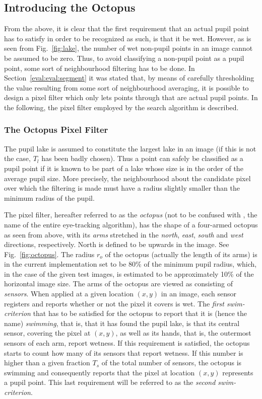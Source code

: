 \subsection{Introducing the Octopus}
\label{algo:seek:octopus}

From the above, it is clear that the first requirement that an actual
pupil point has to satisfy in order to be recognized as such, is that
it be wet.  However, as is seen from Fig.~\ref{fig:lake}, the number
of wet non-pupil points in an image cannot be assumed to be zero.
Thus, to avoid classifying a non-pupil point as a pupil point, some
sort of neighbourhood filtering has to be done.  In
Section~\ref{eval:eval:segment} it was stated that, by means of
carefully thresholding the value resulting from some sort of
neighbourhood averaging, it is possible to design a pixel filter which
only lets points through that are actual pupil points.  In the
following, the pixel filter employed by the search algorithm is
described.

\subsubsection{The Octopus Pixel Filter}

The pupil lake is assumed to constitute the largest lake in an image
(if this is not the case, $T_{l}$ has been badly chosen).  Thus a point
can safely be classified as a pupil point if it is known to be part of
a lake whose size is in the order of the average pupil size.  More
precisely, the neighbourhood about the candidate pixel over which the
filtering is made must have a radius slightly smaller than the minimum
radius of the pupil.  

The pixel filter, hereafter referred to as the {\em octopus\/} (not to
be confused with {\octopus}, the name of the entire eye-tracking
algorithm), has the shape of a four-armed octopus as seen from above,
with its {\em arms\/} stretched in the {\em north\/}, {\em east\/},
{\em south\/} and {\em west\/} directions, respectively.  North is
defined to be upwards in the image.  See Fig.~\ref{fig:octopus}.  The
radius $r_{o}$ of the octopus (actually the length of its arms) is in
the current implementation set to be 80\% of the minimum pupil radius,
which, in the case of the given test images, is estimated to be
approximately 10\% of the horizontal image size.  The arms of the
octopus are viewed as consisting of {\em sensors\/}.  When applied at
a given location $(x,y)$ in an image, each sensor registers and
reports whether or not the pixel it covers is wet.  The {\em first
  swim-criterion\/} that has to be satisfied for the octopus to report
that it is (hence the name) {\em swimming\/}, that is, that it has
found the pupil lake, is that its central sensor, covering the pixel
at $(x,y)$, as well as its hands, that is, the outermost sensors of
each arm, report wetness.  If this requirement is satisfied, the
octopus starts to count how many of its sensors that report wetness.
If this number is higher than a given fraction $T_{s}$ of the total
number of sensors, the octopus is swimming and consequently reports
that the pixel at location $(x,y)$ represents a pupil point.  This
last requirement will be referred to as the {\em second
  swim-criterion\/}.


